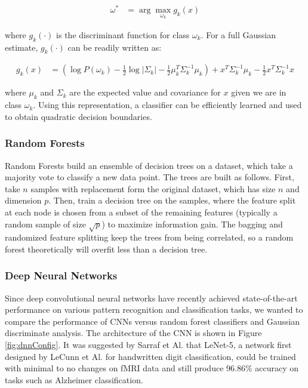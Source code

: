\documentclass{article}[12pt]
\begin{document}
   \begin{align*}
   \omega^* &= \arg \max_{\omega_k} g_k(x)
   \end{align*}
   
   where $g_k(\cdot)$ is the discriminant function for class $\omega_k$. For a full Gaussian estimate, $g_k(\cdot)$ can be readily written as:
   
   \begin{align*}
   g_k(x) &= \left( \log P(\omega_k) - \frac{1}{2} \log \left| \Sigma_k \right| - \frac{1}{2} \mu_k^T \Sigma_k^{-1} \mu_k \right) + x^T \Sigma_k^{-1} \mu_k - \frac{1}{2} x^T \Sigma_k^{-1} x 
   \end{align*}
   
   where $\mu_k$ and $\Sigma_k$ are the expected value and covariance for $x$ given we are in class $\omega_k$. Using this representation, a classifier can be efficiently learned and used to obtain quadratic decision boundaries.
   
   
   \subsubsection{Random Forests}
   Random Forests build an ensemble of decision trees on a dataset, which take a majority vote to classify a new data point. The trees are built as follows.  First, take $n$ samples with replacement form the original dataset, which has size $n$ and dimension $p$.  Then, train a decision tree on the samples, where the feature split at each node is chosen from a subset of the remaining features (typically a random sample of size $\sqrt{p}$) to maximize information gain.  The bagging and randomized feature splitting keep the trees from being correlated, so a random forest theoretically will overfit less than a decision tree.
   
   \subsubsection{Deep Neural Networks}
   Since deep convolutional neural networks have recently achieved state-of-the-art performance on various pattern recognition and classification tasks, we wanted to compare the performance of CNNs versus random forest classifiers and Gaussian discriminate analysis. The architecture of the CNN is shown in Figure \ref{fig:dnnConfig}.  It was suggested by Sarraf et Al. \cite{sarraf2016fmri} that LeNet-5, a network first designed by LeCunn et Al. \cite{lecun1998gradient} for handwritten digit classification, could be trained with minimal to no changes on fMRI data and still produce 96.86\% accuracy on tasks such as Alzheimer classification. 
   
\end{document}
